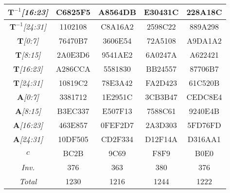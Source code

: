 \begin{sidewaystable}
\begin{center}
\begin{tabular}{|c||c|c|c|c|}
\emph{$\mathbf{T}^{-1}$[16:23]} & C6825F5 &  A8564DB &  E30431C &  228A18C  \\ \hline
\emph{$\mathbf{T}^{-1}$[24:31]} & 1102108 &  C8A16A2 &  2598C22 &  889A298  \\ \hline
\emph{$\mathbf{T}$[0:7]} & 76470B7 &  3606E54 &  72A5108 &  A9DA1A2  \\ \hline
\emph{$\mathbf{T}$[8:15]} & 2A0E3D6 &  9541AE2 &  6A0247A &  A622421  \\ \hline
\emph{$\mathbf{T}$[16:23]} & A286CCA &  5581830 &  BB24557 &  87706B7   \\ \hline
\emph{$\mathbf{T}$[24:31]} & 10819C2 &  78E3A42 &  FA2D423 &  61C520B  \\ \hline
\emph{$\mathbf{A}$[0:7]} & 3381712 &  1E2951C &  3CB3B47 &  CEDC8E4  \\ \hline
\emph{$\mathbf{A}$[8:15]} & B3EC337 &  E507F13 &  7588C61 &  9240E4B  \\ \hline
\emph{$\mathbf{A}$[16:23]} & 463E857 &  0FEF2D7 &  2A3D303 &  5FD76FD  \\ \hline
\emph{$\mathbf{A}$[24:31]} & 10DF505 &  CD2F334 &  D12F14A &  D316AA1  \\ \hline
\emph{$c$} & BC2B &  9C69 &  F8F9 &  B0E0  \\ \hline
\emph{Inv.} & 376 &  363 &  380 &  376  \\ \hline
\emph{Total} &   1230 &   1216 &   1244 &   1222  \\ \hline
    \end{tabular}
\end{center}
\end{sidewaystable}

